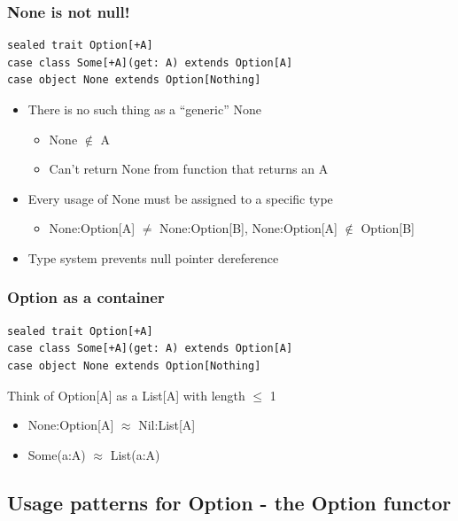 \documentclass{beamer}
\begin{document}
\begin{frame}[fragile,t]
  \frametitle{{\ttfamily None} is not {\ttfamily null}!}
\begin{lstlisting}
sealed trait Option[+A]
case class Some[+A](get: A) extends Option[A]
case object None extends Option[Nothing]
\end{lstlisting}
  \begin{itemize}
    \item There is no such thing as a ``generic'' {\ttfamily None}
      \begin{itemize}
        \item {\ttfamily None} $\not\in$ {\ttfamily A}
        \item Can't return {\ttfamily None} from function that returns an {\ttfamily A}
      \end{itemize}
    \item Every usage of {\ttfamily None} must be assigned to a specific type
      \begin{itemize}
        \item {\ttfamily None:Option[A]} $\neq$ {\ttfamily None:Option[B]}, {\ttfamily None:Option[A]} $\not\in$ {\ttfamily Option[B]}
      \end{itemize}
    \item Type system prevents null pointer dereference
  \end{itemize}
\end{frame}

\begin{frame}[fragile,t]
  \frametitle{{\ttfamily Option} as a container}
\begin{lstlisting}
sealed trait Option[+A]
case class Some[+A](get: A) extends Option[A]
case object None extends Option[Nothing]
\end{lstlisting}
  Think of {\ttfamily Option[A]} as a {\ttfamily List[A]} with length $\le$ 1
  \begin{itemize}
    \item {\ttfamily None:Option[A]} $\approx$ {\ttfamily Nil:List[A]}
    \item {\ttfamily Some(a:A)} $\approx$ {\ttfamily List(a:A)}
  \end{itemize}
\end{frame}

\subsection{Usage patterns for Option - the Option functor}
\end{document}
